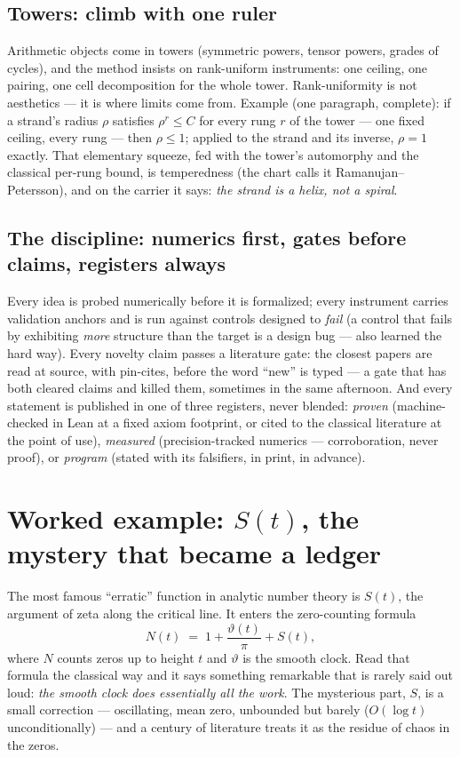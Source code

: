 \documentclass[11pt]{article}
\begin{document}
\subsection{Towers: climb with one ruler}

Arithmetic objects come in towers (symmetric powers, tensor powers, grades of
cycles), and the method insists on rank-uniform instruments: one ceiling, one
pairing, one cell decomposition for the whole tower.  Rank-uniformity is not
aesthetics --- it is where limits come from.  Example (one paragraph, complete):
if a strand's radius $\rho$ satisfies $\rho^r\le C$ for every rung $r$ of the
tower --- one fixed ceiling, every rung --- then $\rho\le1$; applied to the strand
and its inverse, $\rho=1$ exactly.  That elementary squeeze, fed with the tower's
automorphy and the classical per-rung bound, is temperedness (the chart calls it
Ramanujan--Petersson), and on the carrier it says: \emph{the strand is a helix,
not a spiral}.

\subsection{The discipline: numerics first, gates before claims, registers always}

Every idea is probed numerically before it is formalized; every instrument
carries validation anchors and is run against controls designed to \emph{fail}
(a control that fails by exhibiting \emph{more} structure than the target is a
design bug --- also learned the hard way).  Every novelty claim passes a
literature gate: the closest papers are read at source, with pin-cites, before
the word ``new'' is typed --- a gate that has both cleared claims and killed
them, sometimes in the same afternoon.  And every statement is published in one
of three registers, never blended: \emph{proven} (machine-checked in Lean at a
fixed axiom footprint, or cited to the classical literature at the point of
use), \emph{measured} (precision-tracked numerics --- corroboration, never
proof), or \emph{program} (stated with its falsifiers, in print, in advance).

\section{Worked example: $S(t)$, the mystery that became a ledger}

The most famous ``erratic'' function in analytic number theory is $S(t)$, the
argument of zeta along the critical line.  It enters the zero-counting formula
\[
N(t)\;=\;1+\frac{\vartheta(t)}{\pi}+S(t),
\]
where $N$ counts zeros up to height $t$ and $\vartheta$ is the smooth clock.
Read that formula the classical way and it says something remarkable that is
rarely said out loud: \emph{the smooth clock does essentially all the work}.
The mysterious part, $S$, is a small correction --- oscillating, mean zero,
unbounded but barely ($O(\log t)$ unconditionally) --- and a century of
literature treats it as the residue of chaos in the zeros.
\end{document}
